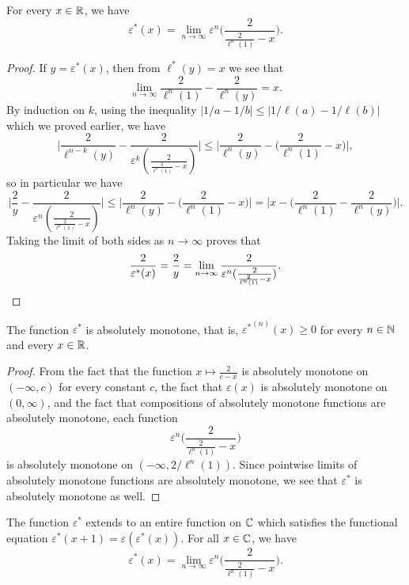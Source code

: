 \documentclass[letterpaper,11pt]{article}
\begin{document}
\begin{prop} For every $x \in \mathbb{R}$, we have
\[
\varepsilon^*(x) = \lim_{n \rightarrow \infty} \varepsilon^{n}\Big(\frac{2}{\frac{2}{\ell^n(1)} - x}\Big).
\]
\end{prop}
\begin{proof} If $y = \varepsilon^*(x)$, then from $\ell^*(y) = x$ we see that
\[
\lim_{n \rightarrow \infty} \frac{2}{\ell^n(1)} - \frac{2}{\ell^n(y)} = x.
\]
By induction on $k$, using the inequality $|1/a - 1/b| \le |1/\ell(a) - 1/\ell(b)|$ which we proved earlier, we have
\[
\Big|\frac{2}{\ell^{n-k}(y)} - \frac{2}{\varepsilon^k(\frac{2}{\frac{2}{\ell^n(1)} - x})}\Big| \le \Big|\frac{2}{\ell^n(y)} - \Big(\frac{2}{\ell^n(1)} - x\Big)\Big|,
\]
so in particular we have
\[
\Big|\frac{2}{y} - \frac{2}{\varepsilon^n(\frac{2}{\frac{2}{\ell^n(1)} - x})}\Big| \le \Big|\frac{2}{\ell^n(y)} - \Big(\frac{2}{\ell^n(1)} - x\Big)\Big| = \Big|x - \Big(\frac{2}{\ell^n(1)} - \frac{2}{\ell^n(y)}\Big)\Big|.
\]
Taking the limit of both sides as $n \rightarrow \infty$ proves that
\[
\frac{2}{\varepsilon^*(x)} = \frac{2}{y} = \lim_{n\rightarrow \infty}\frac{2}{\varepsilon^n(\frac{2}{\frac{2}{\ell^n(1)} - x})}.\qedhere
\]
\end{proof}

\begin{cor} The function $\varepsilon^*$ is absolutely monotone, that is, ${\varepsilon^*}^{(n)}(x) \ge 0$ for every $n \in \mathbb{N}$ and every $x \in \mathbb{R}$.
\end{cor}
\begin{proof} From the fact that the function $x \mapsto \frac{2}{c-x}$ is absolutely monotone on $(-\infty, c)$ for every constant $c$, the fact that $\varepsilon(x)$ is absolutely monotone on $(0,\infty)$, and the fact that compositions of absolutely monotone functions are absolutely monotone, each function
\[
\varepsilon^{n}\Big(\frac{2}{\frac{2}{\ell^n(1)} - x}\Big)
\]
is absolutely monotone on $(-\infty, 2/\ell^n(1))$. Since pointwise limits of absolutely monotone functions are absolutely monotone, we see that $\varepsilon^*$ is absolutely monotone as well.
\end{proof}

\begin{cor} The function $\varepsilon^*$ extends to an entire function on $\mathbb{C}$ which satisfies the functional equation $\varepsilon^*(x+1) = \varepsilon(\varepsilon^*(x))$. For all $x \in \mathbb{C}$, we have
\[
\varepsilon^*(x) = \lim_{n \rightarrow \infty} \varepsilon^{n}\Big(\frac{2}{\frac{2}{\ell^n(1)} - x}\Big).
\]
\end{cor}
\end{document}
